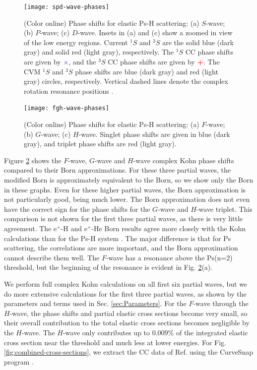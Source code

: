 \documentclass[preprint,showpacs,showkeys,preprintnumbers,amsmath,amssymb,longbibliography,pra,aps]{revtex4-1}
\begin{document}
\begin{figure}[H]
	\centering
	\texttt{[image: spd-wave-phases]}
	\caption{(Color online) Phase shifts for elastic Ps-H scattering: (a) $S$-wave;
(b) $P$-wave; (c) $D$-wave. Insets in (a) and (c) show a zoomed in view of 
the low energy regions. Current $^1S$ and $^3S$ are the solid blue (dark gray)
 and solid red (light gray), respectively. The $^1S$ CC phase shifts
\cite{Walters2004} are given by \mbox{\textcolor{blue}{$\times$}}, and the
$^3S$ CC phase shifts \cite{Blackwood2002} are given by
\mbox{\textcolor{red}{\textbf{+}}}. The CVM $^1S$ and $^3S$ phase shifts
\cite{Zhang2012} are blue (dark gray) and red (light gray) circles,
respectively. Vertical dashed lines denote the complex rotation resonance
positions \cite{Yan1999,Yan1998a,Ho1998}.}
	\label{fig:spd-wave-phases}
\end{figure}

\begin{figure}[H]
	\centering
	\texttt{[image: fgh-wave-phases]}
	\caption{(Color online) Phase shifts for elastic Ps-H scattering:
(a) $F$-wave; (b) $G$-wave; (c) $H$-wave. Singlet phase shifts are given in blue
(dark gray), and triplet phase shifts are red (light gray).}
	\label{fig:fgh-wave-phases}
\end{figure}

Figure \ref{fig:fgh-wave-phases} shows the $F$-wave, $G$-wave and $H$-wave complex 
Kohn phase shifts compared to their Born approximations. For these three 
partial waves, the modified Born is approximately equivalent to the Born, so 
we show only the Born in these graphs. Even for these higher partial waves, 
the Born approximation is not particularly good, being much lower. The Born 
approximation does not even have the correct sign for the phase shifts for 
the $G$-wave and $H$-wave triplet. This comparison is not shown for the first 
three partial waves, as there is very little agreement. The e$^+$-H and
e$^+$-He Born results agree more closely with the Kohn calculations than
for the Ps-H system \cite{VanReeth2014}. The major difference is that for Ps
scattering, the correlations are more important, and the Born approximation
cannot describe them well. The $F$-wave has a resonance above the Ps(n=2)
threshold, but the beginning of the resonance is evident in Fig.
\ref{fig:fgh-wave-phases}(a).

We perform full complex Kohn calculations on all first six partial waves, but 
we do more extensive calculations for the first three partial waves, as shown 
by the parameters and terms used in Sec. \ref{sec:Parameters}. For the $F$-wave 
through the $H$-wave, the phase shifts and partial elastic cross sections 
become very small, so their overall contribution to the total elastic cross 
sections becomes negligible by the $H$-wave. The $H$-wave only contributes up to
$0.009\%$ of the integrated elastic cross section near the threshold and much 
less at lower energies. For Fig. \ref{fig:combined-cross-sections}, we 
extract the CC data of Ref. \cite{Walters2004} using the CurveSnap program 
\cite{CurveSnap}.
\end{document}

